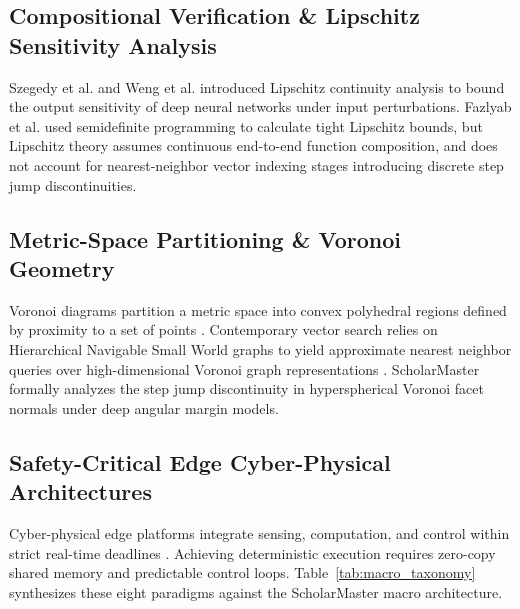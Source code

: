 \documentclass[conference]{IEEEtran}
\begin{document}
\subsection{Compositional Verification \& Lipschitz Sensitivity Analysis}
Szegedy et al. \cite{szegedy2013intriguing} and Weng et al. \cite{weng2018towards} introduced Lipschitz continuity analysis to bound the output sensitivity of deep neural networks under input perturbations. Fazlyab et al. \cite{fazlyab2019efficient} used semidefinite programming to calculate tight Lipschitz bounds, but Lipschitz theory assumes continuous end-to-end function composition, and does not account for nearest-neighbor vector indexing stages introducing discrete step jump discontinuities.

\subsection{Metric-Space Partitioning \& Voronoi Geometry}
Voronoi diagrams partition a metric space into convex polyhedral regions defined by proximity to a set of points \cite{aurenhammer1991voronoi, cover1967nearest}. Contemporary vector search relies on Hierarchical Navigable Small World graphs to yield approximate nearest neighbor queries over high-dimensional Voronoi graph representations \cite{malkov2018efficient}. ScholarMaster formally analyzes the step jump discontinuity in hyperspherical Voronoi facet normals under deep angular margin models.

\subsection{Safety-Critical Edge Cyber-Physical Architectures}
Cyber-physical edge platforms integrate sensing, computation, and control within strict real-time deadlines \cite{baheti2011cyber, lee2008cyber}. Achieving deterministic execution requires zero-copy shared memory and predictable control loops. Table~\ref{tab:macro_taxonomy} synthesizes these eight paradigms against the ScholarMaster macro architecture.
\end{document}
